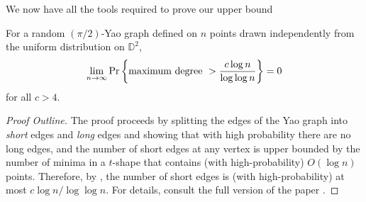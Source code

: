 \documentclass[10pt]{llncs}
\newcommand{\D}{\mathbb{D}}
\newcommand{\PROB}{\Pr}
\newcommand{\EXP}{\mathrm{E}}
\begin{document}
We now have all the tools required to prove our upper bound

\begin{thm}
For a random $(\pi/2)$-Yao graph defined on $n$ points drawn
independently from the uniform distribution on
$\D^2$, 
\[
\lim_{n\to\infty} \PROB \left\{ \hbox{\rm maximum degree}~> {c \log n \over
\log \log n} \right\} = 0
\]
for all $c > 4$.
\end{thm}

\begin{proof}[Proof Outline]
The proof proceeds by splitting the edges of the Yao graph into
\emph{short} edges and \emph{long} edges and showing that with high
probability there are no long edges, and the number of short edges at any
vertex is upper bounded by the number of minima in a $t$-shape that
contains (with high-probability) $O(\log n)$ points. Therefore, by
, the number of short edges is (with
high-probability) at most $c\log n/\log\log n$.  For details, consult the
full version of the paper \cite{dgm09}.
%
%
%

\end{proof}
\end{document}
